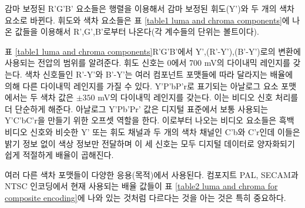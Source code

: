 감마 보정된 R'G'B' 요소들은 행렬을 이용해서 감마 보정된 휘도(Y')와 두 개의 색차 요소로 바뀐다. 휘도와 색차 요소들은 표 \ref{table1 luma and chroma components}에 나온 값들을 이용해서 R',G',B'로부터 나온다(각 계수들의 단위는 볼트이다).


표 \ref{table1 luma and chroma components}\은 R'G'B'에서 Y',(R'-Y'),(B'-Y')로의 변환에 사용되는 전압의 범위를 알려준다. 휘도 신호는 0에서 700 mV의 다이내믹 레인지를 갖는다.
색차 신호들인 R'-Y'와 B'-Y'는 여러 컴포넌트 포맷들에 따라 달라지는 배율에 의해 다른 다이내믹 레인지를 가질 수 있다. Y'P'bP'r로 표기되는 아날로그 요소 포맷에서는 두 색차 값은 $\pm 350$ mV의 다이내믹 레인지를 갖는다. 이는 비디오 신호 처리를 더 단순하게 해준다.
아날로그 Y'Pb'Pr' 값은 디지털 표준에서 보통 사용되는 Y'C'bC'r을 만들기 위한 오프셋 역할을 한다. 이로부터 나오는 비디오 요소들은 흑백 비디오 신호와 비슷한 Y' 또는 휘도 채널과 두 개의 색차 채널인 C'b와 C'r인데 이들은 밝기 정보 없이 색상 정보만 전달하며 이 세 신호는 모두 디지털 데이터로 양자화되기 쉽게 적절하게 배율이 곱해진다.


여러 다른 색차 포맷들이 다양한 응용(목적)에서 사용된다. 컴포지트 PAL, SECAM과 NTSC 인코딩에서 현재 사용되는 배율 값들이 표 \ref{table2 luma and chroma for composite encoding}에 나와 있는 것처럼 다르다는 것을 아는 것은 특히 중요하다.
